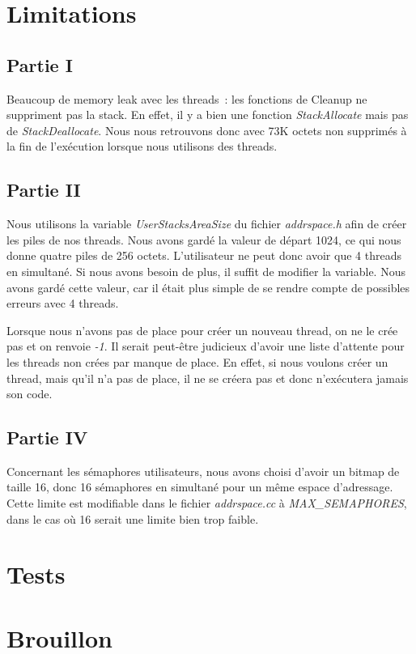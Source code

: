 \documentclass{article}
\begin{document}
\section{Limitations}
\subsection{Partie I}
Beaucoup de memory leak avec les threads : les fonctions de Cleanup ne
suppriment pas la stack. En effet, il y a bien une fonction
\textit{StackAllocate} mais pas de \textit{StackDeallocate}. Nous nous
retrouvons donc avec 73K octets non supprimés à la fin de l'exécution lorsque
nous utilisons des threads.

\subsection{Partie II}
Nous utilisons la variable \textit{UserStacksAreaSize} du fichier
\textit{addrspace.h} afin de créer les piles de nos threads. Nous avons gardé
la valeur de départ 1024, ce qui nous donne quatre piles de 256 octets.
L'utilisateur ne peut donc avoir que 4 threads en simultané. Si nous avons
besoin de plus, il suffit de modifier la variable. Nous avons gardé cette
valeur, car il était plus simple de se rendre compte de possibles erreurs avec
4 threads.

Lorsque nous n'avons pas de place pour créer un nouveau thread, on ne le crée pas et on renvoie
\textit{-1}. Il serait peut-être judicieux d'avoir une liste d'attente pour les threads non 
crées par manque de place. En effet, si nous voulons créer un thread, mais qu'il n'a pas de place,
il ne se créera pas et donc n'exécutera jamais son code.

\subsection{Partie IV}
Concernant les sémaphores utilisateurs, nous avons choisi d'avoir un bitmap de
taille 16, donc 16 sémaphores en simultané pour un même espace d'adressage.
Cette limite est modifiable dans le fichier \textit{addrspace.cc} à
\textit{MAX\_SEMAPHORES}, dans le cas où 16 serait une limite bien trop faible.

\section{Tests}

\section{Brouillon}
\end{document}

